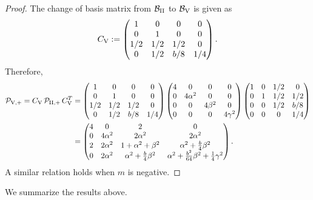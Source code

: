 \documentclass[table]{amsart}
\numberwithin{equation}{section}
\begin{document}
\begin{proof}
    The change of basis matrix from $\mathcal{B}_{\rm{II}}$ to $\mathcal{B}_{\rm{V}}$ is given as
    $$
    C_{\rm{V}}:= 
    \begin{pmatrix}
1 & 0 & 0 & 0 \\
0 & 1 & 0 & 0 \\
1/2 & 1/2 & 1/2 & 0 \\
0 & 1/2 & b/8 & 1/4
\end{pmatrix}.
    $$
    Therefore,
     \begin{align*}
    \mathcal{P}_{\rm{V}, +} = C_{\rm{V}} \, \mathcal{P}_{\rm{II}, +} \, C_{\rm{V}}^T &= 
      \begin{pmatrix}
1 & 0 & 0 & 0 \\
0 & 1 & 0 & 0 \\
1/2 & 1/2 & 1/2 & 0 \\
0 & 1/2 & b/8 & 1/4
\end{pmatrix}
\begin{pmatrix}
4 & 0 & 0 & 0 \\
0 & 4\alpha^2 & 0 & 0 \\
0 & 0 & 4\beta^2 & 0 \\
0 & 0 & 0 & 4\gamma^2
\end{pmatrix}
 \begin{pmatrix}
1 & 0 & 1/2 & 0 \\
0 & 1 & 1/2 & 1/2 \\
0 & 0 & 1/2 &  b/8 \\
0 & 0 & 0 & 1/4
\end{pmatrix} \\ 
&= \begin{pmatrix} 4 & 0 & 2 & 0 \\ 0 & 4\alpha^2 & 2\alpha^2 & 2\alpha^2 \\ 2 & 2\alpha^2 & 1 + \alpha^2 + \beta^2 & \alpha^2 + \frac{b}{4}\beta^2 \\ 0 & 2\alpha^2 & \alpha^2 + \frac{b}{4}\beta^2 & \alpha^2 + \frac{b^2}{64}\beta^2 + \frac{1}{4}\gamma^2 \end{pmatrix}.
    \end{align*}
    A similar relation holds when $m$ is negative.
\end{proof}

We summarize the results above.
\end{document}
